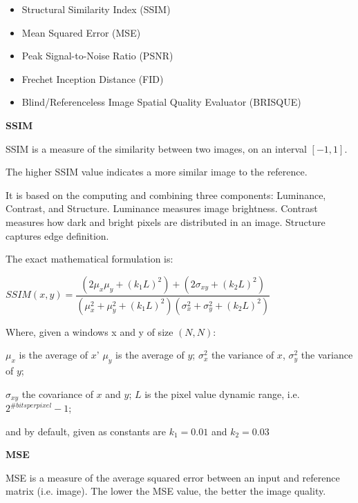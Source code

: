 \begin{itemize}
	\item Structural Similarity Index (SSIM)
	\item Mean Squared Error (MSE)
    \item Peak Signal-to-Noise Ratio (PSNR)
	\item Frechet Inception Distance (FID)
	\item Blind/Referenceless Image Spatial Quality Evaluator (BRISQUE)
\end{itemize}

\vspace{3mm}

\textbf{SSIM}


SSIM is a measure of the similarity between two images, on an interval $[-1, 1]$.

The higher SSIM value indicates a more similar image to the reference. 

It is based on the computing and combining three components: Luminance, Contrast, and Structure.
Luminance measures image brightness. Contrast measures how dark and bright pixels are distributed in an image. 
Structure captures edge definition. \citep{SSIM_bovik}
\vspace{2mm}

The exact mathematical formulation is:

\vspace{3mm}
\begin{center}
$SSIM(x,y) = \dfrac{(2\mu_x\mu_y + (k_1 L)^2) + (2 \sigma _{xy} + (k_2 L)^2)}{(\mu_x^2 + \mu_y^2+(k_1 L)^2) (\sigma_x^2 + \sigma_y^2+(k_2 L)^2)}$
\end{center}
\vspace{3mm}

Where, given a windows x and y of size $(N,N)$:

$\mu_x$ is the average of $x$'  $\mu_y$ is the average of $y$;  $\sigma _{x}^{2}$ the variance of $x$, $\sigma _{y}^{2}$ the variance of $y$;

$\sigma_{xy}$ the covariance of $x$ and $y$; $L$ is the pixel value dynamic range, i.e. $2^{\#bits per pixel}-1$;

and by default, given as constants are $k_{1}=0.01$ and $k_{2}=0.03$ \citep{SSIM_bovik}

\vspace{6mm}

\textbf{MSE}


MSE is a measure of the average squared error between an input and reference matrix (i.e. image). 
The lower the MSE value, the better the image quality.

